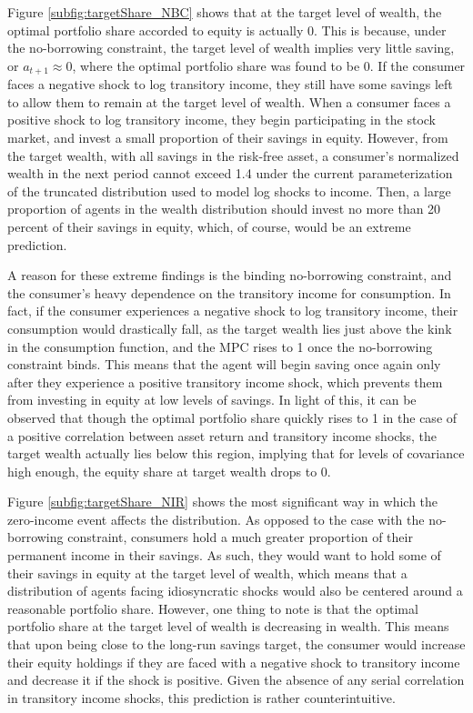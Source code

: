 Figure \ref{subfig:targetShare_NBC} shows that at the target level of wealth, the optimal portfolio share accorded to equity is actually 0. This is because, under the no-borrowing constraint, the target level of wealth implies very little saving, or $a_{t+1} \approx 0$, where the optimal portfolio share was found to be $0$. If the consumer faces a negative shock to log transitory income, they still have some savings left to allow them to remain at the target level of wealth. When a consumer faces a positive shock to log transitory income, they begin participating in the stock market, and invest a small proportion of their savings in equity. However, from the target wealth, with all savings in the risk-free asset, a consumer's normalized wealth in the next period cannot exceed 1.4 under the current parameterization of the truncated distribution used to model log shocks to income. Then, a large proportion of agents in the wealth distribution should invest no more than 20 percent of their savings in equity, which, of course, would be an extreme prediction.

A reason for these extreme findings is the binding no-borrowing constraint, and the consumer's heavy dependence on the transitory income for consumption. In fact, if the consumer experiences a negative shock to log transitory income, their consumption would drastically fall, as the target wealth lies just above the kink in the consumption function, and the MPC rises to 1 once the no-borrowing constraint binds. This means that the agent will begin saving once again only after they experience a positive transitory income shock, which prevents them from investing in equity at low levels of savings. In light of this, it can be observed that though the optimal portfolio share quickly rises to 1 in the case of a positive correlation between asset return and transitory income shocks, the target wealth actually lies below this region, implying that for levels of covariance high enough, the equity share at target wealth drops to 0.

Figure \ref{subfig:targetShare_NIR} shows the most significant way in which the zero-income event affects the distribution. As opposed to the case with the no-borrowing constraint, consumers hold a much greater proportion of their permanent income in their savings. As such, they would want to hold some of their savings in equity at the target level of wealth, which means that a distribution of agents facing idiosyncratic shocks would also be centered around a reasonable portfolio share. However, one thing to note is that the optimal portfolio share at the target level of wealth is decreasing in wealth. This means that upon being close to the long-run savings target, the consumer would increase their equity holdings if they are faced with a negative shock to transitory income and decrease it if the shock is positive. Given the absence of any serial correlation in transitory income shocks, this prediction is rather counterintuitive.